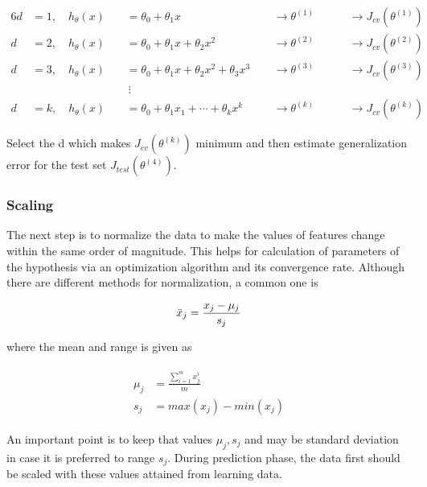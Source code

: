 \begin{alignat*}{6}
\label{eqn:exampCostFunc}
d &= 1, \quad h_{\theta}(x) \ && = \theta_0 + \theta_1 x\ \ && \longrightarrow \theta^{(1)}\ \ && \quad \longrightarrow J_{cv}(\theta^{(1)})\
\\
d &= 2, \quad h_{\theta}(x) \ && = \theta_0 + \theta_1 x + \theta_2 x^2 \ \ && \longrightarrow \theta^{(2)}\ \ && \quad \longrightarrow J_{cv}(\theta^{(2)})\
\\
d &= 3, \quad h_{\theta}(x) \ && = \theta_0 + \theta_1 x + \theta_2 x^2 + \theta_3 x^3\ \ && \longrightarrow \theta^{(3)}\ \ && \quad \longrightarrow J_{cv}(\theta^{(3)})\
\\
& \ &&\ \vdots \ &&\ \ &&\ 
\\
d &= k, \quad h_{\theta}(x) \ && = \theta_0 + \theta_1 x_1 + \cdots+ \theta_k x^k\ \ && \longrightarrow \theta^{(k)}\ \ && \quad \longrightarrow J_{cv}(\theta^{(k)})\
\end{alignat*}

Select the d which makes $J_{cv}(\theta^{(k)})$ minimum and then estimate generalization error for the test set $J_{test}(\theta^{(4)})$.

\subsubsection{Scaling}

The next step is to normalize the data to make the values of features change within the same order of magnitude. 
This helps for calculation of parameters of the hypothesis via an optimization algorithm and its convergence rate.  
Although there are different methods for normalization, a common one is

\begin{equation}{\label{eqn:scalingFeatures}}
\bar{x}_j = \frac{x_j - \mu_j}{s_j} 
\end{equation} 

where the mean and range is given as

\begin{align}
\label{eqn:meandAndRange}
\begin{split}
\mu_j & = \frac{\sum\limits_{i=1}^m {x_j^i} }{m}
\\
s_j & = max(x_j) - min(x_j)
\end{split}
\end{align}

An important point is to keep that values $\mu_j, s_j$ and may be standard deviation in case it is preferred to range $s_j$. 
During prediction phase, the data first should be scaled with these values attained from learning data.


